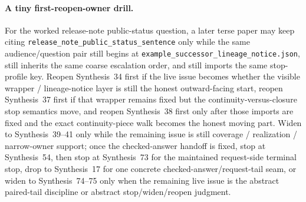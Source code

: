 \documentclass[11pt]{article}
\begin{document}
\paragraph{A tiny first-reopen-owner drill.}
For the worked release-note public-status question, a later terse paper may keep citing \nolinkurl{release_note_public_status_sentence} only while the same audience/question pair still begins at \nolinkurl{example_successor_lineage_notice.json}, still inherits the same coarse escalation order, and still imports the same stop-profile key. Reopen Synthesis~34 first if the live issue becomes whether the visible wrapper / lineage-notice layer is still the honest outward-facing start, reopen Synthesis~37 first if that wrapper remains fixed but the continuity-versus-closure stop semantics move, and reopen Synthesis~38 first only after those imports are fixed and the exact continuity-piece walk becomes the honest moving part. Widen to Synthesis~39--41 only while the remaining issue is still coverage / realization / narrow-owner support; once the checked-answer handoff is fixed, stop at Synthesis~54, then stop at Synthesis~73 for the maintained request-side terminal stop, drop to Synthesis~17 for one concrete checked-answer/request-tail seam, or widen to Synthesis~74--75 only when the remaining live issue is the abstract paired-tail discipline or abstract stop/widen/reopen judgment.\cite{series:workedexample,series:downstreamnormalforms,series:statusenvelopes,series:sentencelocks,series:challengestops,series:challengebranches,series:challengecoverage,series:challengesurfacehooks,series:challengeterminalwitnesses,series:challengeanswerreviewmenus,series:publicrequestresponsepacketrefreshresponsepacketclosureverdicts,series:pairedterminalcitationdiscipline,series:pairedterminalcutoverrules,series:workedexample}
\end{document}
